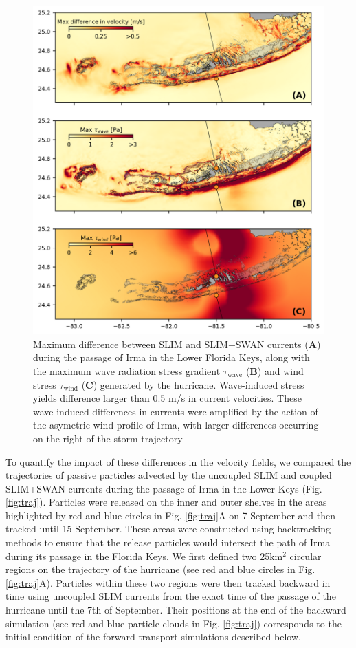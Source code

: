 \documentclass[11pt,a4paper]{article}
\begin{document}
\begin{figure}
    \centering
    \includegraphics[width=\textwidth]{fig/max_diff_reefs.png}
    \caption{Maximum difference between SLIM and SLIM+SWAN currents (\textbf{A}) during the passage of Irma in the Lower Florida Keys, along with the maximum wave radiation stress gradient {\boldmath$\tau$}$_\text{wave}$ (\textbf{B}) and wind stress {\boldmath$\tau$}$_\text{wind}$ (\textbf{C}) generated by the hurricane. Wave-induced stress yields difference larger than 0.5 m/s in current velocities. These wave-induced differences in currents were amplified by the action of the asymetric wind profile of Irma, with larger differences occurring on the right of the storm trajectory}
    \label{fig:diff}
\end{figure}

To quantify the impact of these differences in the velocity fields, we compared the trajectories of passive particles advected by the uncoupled SLIM and coupled SLIM+SWAN currents during the passage of Irma in the Lower Keys (Fig. \ref{fig:traj}). Particles were released on the inner and outer shelves in the areas highlighted by red and blue circles in Fig. \ref{fig:traj}A on 7 September and then tracked until 15 September. These areas were constructed using backtracking methods \citep{dobbelaerereport} to ensure that the release particles would intersect the path of Irma during its passage in the Florida Keys. We first defined two 25km$^\text{2}$ circular regions on the trajectory of the hurricane (see red and blue circles in Fig. \ref{fig:traj}A). Particles within these two regions were then tracked backward in time using uncoupled SLIM currents from the exact time of the passage of the hurricane until the 7th of September. Their positions at the end of the backward simulation (see red and blue particle clouds in Fig. \ref{fig:traj}) corresponds to the initial condition of the forward transport simulations described below. 
\end{document}
